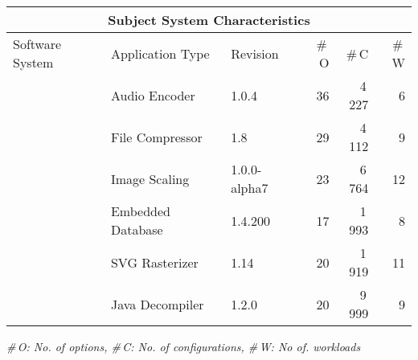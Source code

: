 \begin{tabularx}{\linewidth}{lllrrr}
		\toprule
		\multicolumn{6}{c}{\textbf{Subject System Characteristics}} \\
		\midrule
		Software System &  Application Type & Revision & \#\,O & \#\,C & \#\,W  \\
		\midrule
		\jumper & Audio Encoder & 1.0.4 & 36 & 4\,227 & 6   \\
		
		\kanzi & File Compressor & 1.8 & 29 & 4\,112 & 9 \\
			
		\dconvert & Image Scaling & 1.0.0-alpha7 & 23 & 6\,764 & 12  \\
				
		\htwo & Embedded Database & 1.4.200 & 17 & 1\,993  & 8  \\
		
		\batik & SVG Rasterizer & 1.14 & 20 & 1\,919 &  11  \\
		
		\jadx & Java Decompiler & 1.2.0 & 20 & 9\,999 & 9  \\
\bottomrule

\end{tabularx}
{\textit{\#\,O: No. of options, \#\,C: No. of configurations, \#\,W: No of. workloads}}
